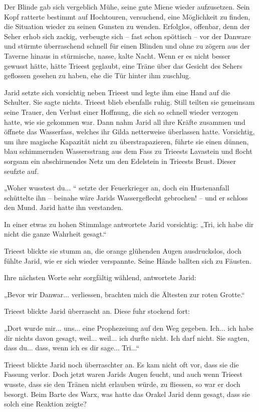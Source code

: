 Der Blinde gab sich vergeblich Mühe, seine gute Miene wieder aufzusetzen. Sein Kopf ratterte bestimmt auf Hochtouren, versuchend, eine Möglichkeit zu finden, die Situation wieder zu seinen Gunsten zu wenden. Erfolglos, offenbar, denn der Seher erhob sich zackig, verbeugte sich – fast schon spöttisch – vor der Danware und stürmte überraschend schnell für einen Blinden und ohne zu zögern aus der Taverne hinaus in stürmische, nasse, kalte Nacht. Wenn er es nicht besser gewusst hätte, hätte Trieest geglaubt, eine Träne über das Gesicht des Sehers geflossen gesehen zu haben, ehe die Tür hinter ihm zuschlug.\bigskip



Jarid setzte sich vorsichtig neben Trieest und legte ihm eine Hand auf die Schulter. Sie sagte nichts. Trieest blieb ebenfalls ruhig. Still teilten sie gemeinsam seine Trauer, den Verlust einer Hoffnung, die sich so schnell wieder verzogen hatte, wie sie gekommen war. Dann nahm Jarid all ihre Kräfte zusammen und öffnete das Wasserfass, welches ihr Gilda netterweise überlassen hatte. Vorsichtig, um ihre magische Kapazität nicht zu überstrapazieren, führte sie einen dünnen, blau schimmernden Wassersstrang aus dem Fass zu Trieests Lavastein und flocht sorgsam ein abschirmendes Netz um den Edelstein in Trieests Brust. Dieser seufzte auf.

„Woher wusstest du... “ setzte der Feuerkrieger an, doch ein Hustenanfall schüttelte ihn – beinahe wäre Jarids Wassergeflecht gebrochen! – und er schloss den Mund. Jarid hatte ihn verstanden.

In einer etwas zu hohen Stimmlage antwortete Jarid vorsichtig: „Tri, ich habe dir nicht die ganze Wahrheit gesagt.“

Trieest blickte sie stumm an, die orange glühenden Augen ausdruckslos, doch fühlte Jarid, wie er sich wieder verspannte. Seine Hände ballten sich zu Fäusten.

Ihre nächsten Worte sehr sorgfältig wählend, antwortete Jarid:

„Bevor wir Danwar... verliessen, brachten mich die Ältesten zur roten Grotte.“

Trieest blickte Jarid überrascht an. Diese fuhr stockend fort:

„Dort wurde mir... uns... eine Prophezeiung auf den Weg gegeben. Ich... ich habe dir nichts davon gesagt, weil... weil... ich durfte nicht. Ich darf nicht. Sie sagten, dass du... dass, wenn ich es dir sage... Tri...“

Trieest blickte Jarid noch überraschter an. Es kam nicht oft vor, dass sie die Fassung verlor. Doch jetzt waren Jarids Augen feucht, und auch wenn Trieest wusste, dass sie den Tränen nicht erlauben würde, zu fliessen, so war er doch besorgt. Beim Barte des Warx, was hatte das Orakel Jarid denn gesagt, dass sie solch eine Reaktion zeigte?

